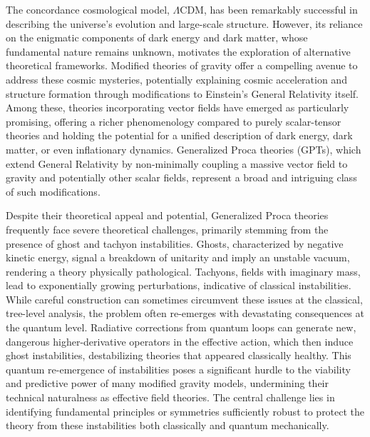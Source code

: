 \documentclass[twocolumn]{aastex631}
\begin{document}
The concordance cosmological model, $\Lambda$CDM, has been remarkably successful in describing the universe's evolution and large-scale structure. However, its reliance on the enigmatic components of dark energy and dark matter, whose fundamental nature remains unknown, motivates the exploration of alternative theoretical frameworks. Modified theories of gravity offer a compelling avenue to address these cosmic mysteries, potentially explaining cosmic acceleration and structure formation through modifications to Einstein's General Relativity itself. Among these, theories incorporating vector fields have emerged as particularly promising, offering a richer phenomenology compared to purely scalar-tensor theories and holding the potential for a unified description of dark energy, dark matter, or even inflationary dynamics. Generalized Proca theories (GPTs), which extend General Relativity by non-minimally coupling a massive vector field to gravity and potentially other scalar fields, represent a broad and intriguing class of such modifications.

Despite their theoretical appeal and potential, Generalized Proca theories frequently face severe theoretical challenges, primarily stemming from the presence of ghost and tachyon instabilities. Ghosts, characterized by negative kinetic energy, signal a breakdown of unitarity and imply an unstable vacuum, rendering a theory physically pathological. Tachyons, fields with imaginary mass, lead to exponentially growing perturbations, indicative of classical instabilities. While careful construction can sometimes circumvent these issues at the classical, tree-level analysis, the problem often re-emerges with devastating consequences at the quantum level. Radiative corrections from quantum loops can generate new, dangerous higher-derivative operators in the effective action, which then induce ghost instabilities, destabilizing theories that appeared classically healthy. This quantum re-emergence of instabilities poses a significant hurdle to the viability and predictive power of many modified gravity models, undermining their technical naturalness as effective field theories. The central challenge lies in identifying fundamental principles or symmetries sufficiently robust to protect the theory from these instabilities both classically and quantum mechanically.
\end{document}
